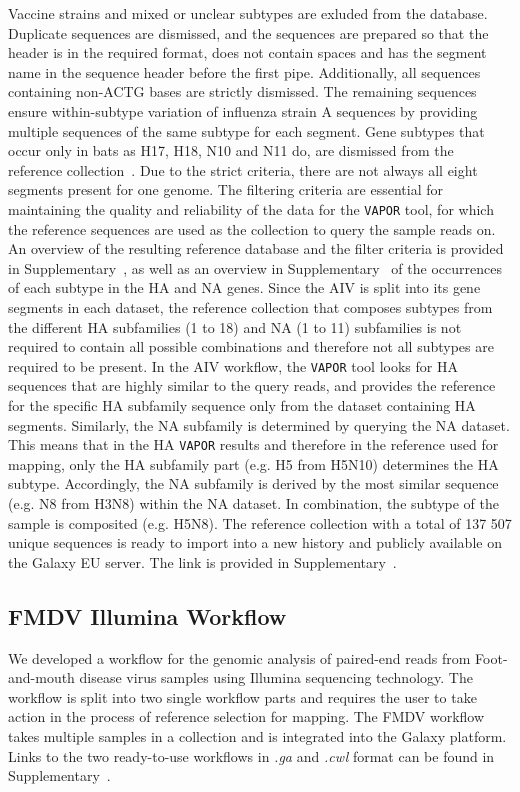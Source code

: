 Vaccine strains and mixed or unclear subtypes are exluded from the database. Duplicate sequences are dismissed, and the sequences are prepared so that the header is in the required format, does not contain spaces and has the segment name in the sequence header before the first pipe. Additionally, all sequences containing non-ACTG bases are strictly dismissed. The remaining sequences ensure within-subtype variation of influenza strain A sequences by providing multiple sequences of the same subtype for each segment. Gene subtypes that occur only in bats as H17, H18, N10 and N11 do, are dismissed from the reference collection~\cite{tong2013new}. Due to the strict criteria, there are not always all eight segments present for one genome. The filtering criteria are essential for maintaining the quality and reliability of the data for the \texttt{VAPOR} tool, for which the reference sequences are used as the collection to query the sample reads on. An overview of the resulting reference database and the filter criteria is provided in Supplementary~, as well as an overview in Supplementary~ of the occurrences of each subtype in the \ac{HA} and \ac{NA} genes. Since the \ac{AIV} is split into its gene segments in each dataset, the reference collection that composes subtypes from the different \ac{HA} subfamilies (1 to 18) and \ac{NA} (1 to 11) subfamilies is not required to contain all possible combinations and therefore not all subtypes are required to be present. In the \ac{AIV} workflow, the \texttt{VAPOR} tool looks for \ac{HA} sequences that are highly similar to the query reads, and provides the reference for the specific \ac{HA} subfamily sequence only from the dataset containing \ac{HA} segments. Similarly, the \ac{NA} subfamily is determined by querying the \ac{NA} dataset. This means that in the \ac{HA} \texttt{VAPOR} results and therefore in the reference used for mapping, only the \ac{HA} subfamily part (e.g. H5 from H5N10) determines the \ac{HA} subtype. Accordingly, the \ac{NA} subfamily is derived by the most similar sequence (e.g. N8 from H3N8) within the \ac{NA} dataset. In combination, the subtype of the sample is composited (e.g. H5N8).
The reference collection with a total of 137 507 unique sequences is ready to import into a new history and publicly available on the Galaxy EU server. The link is provided in Supplementary~. 

\subsection{FMDV Illumina Workflow}\label{sec:fmdv-wf}
We developed a workflow for the genomic analysis of paired-end reads from Foot-and-mouth disease virus samples using Illumina sequencing technology. The workflow is split into two single workflow parts and requires the user to take action in the process of reference selection for mapping. The \ac{FMDV} workflow takes multiple samples in a collection and is integrated into the Galaxy platform. Links to the two ready-to-use workflows in \textit{.ga} and \textit{.cwl} format can be found in Supplementary~.\\

